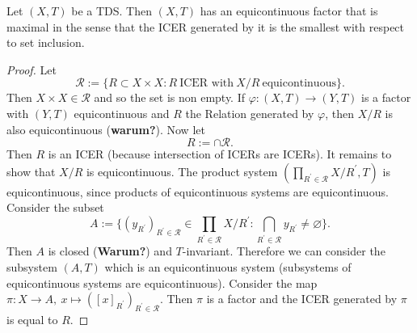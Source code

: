 \begin{theorem}
  Let $(X,T)$ be a TDS.
  Then $(X,T)$ has an equicontinuous factor that is maximal in the sense that the ICER generated by it is the smallest with respect to set inclusion.
\end{theorem}
\begin{proof}
  Let
  \begin{equation*}
    \mathcal{R} := \{ R \subset X \times X : R \ \text{ICER with} \ X/R \ \text{equicontinuous}\}.
  \end{equation*}
  Then $ X \times X \in \mathcal{R}$ and so the set is non empty.
  If $\varphi : (X,T)\to (Y,T)$ is a factor with $(Y,T)$ equicontinuous and $R$ the Relation generated by $\varphi$, then $X/R$ is also equicontinuous (\textbf{warum?}).
  Now let 
  \begin{equation*}
    R:= \cap \mathcal{R}.
  \end{equation*}
  Then $R$ is an ICER (because intersection of ICERs are ICERs).
  It remains to show that $X/R$ is equicontinuous.
  The product system $(\prod_{R^\prime \in \mathcal{R}} X/R^\prime,T)$ is equicontinuous, since products of equicontinuous systems are equicontinuous.
  Consider the subset
  \begin{equation*}
    A:=   
 \bigg\{ (y_{R^\prime})_{R^\prime \in \mathcal{R}} \in \prod_{R^\prime \in \mathcal{R}} X/R^\prime : \bigcap_{R^\prime \in \mathcal{R}} y_{R^\prime} \neq \varnothing \bigg \}.
  \end{equation*}
  Then $A$ is closed (\textbf{Warum?}) and $T$-invariant.
  Therefore we can consider the subsystem $(A,T)$ which is an equicontinuous system (subsystems of equicontinuous systems are equicontinuous).
  Consider the map $\pi: X \to  A , \  x  \mapsto ([x]_{R^\prime})_{R^\prime \in \mathcal{R}}$.
  Then $\pi$ is a factor and the ICER generated by $\pi$ is equal to $R$.
\end{proof}
